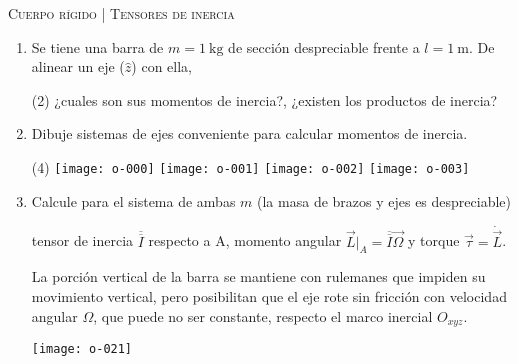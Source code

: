 \documentclass[11pt, spanish, a4paper, twoside]{article}
\begin{document}
\begin{center}
  \textsc{\large Cuerpo rígido | Tensores de inercia}
\end{center}


\begin{enumerate}



\item Se tiene una barra de \(m= \SI{1}{\kilo\gram}\) de sección despreciable frente a \(l= \SI{1}{\metre}\).
De alinear un eje (\(\hat{z}\)) con ella, 
\begin{tasks}(2)
	\task	¿cuales son sus momentos de inercia?,
	\task ¿existen los productos de inercia? 
\end{tasks}


\item
Dibuje sistemas de ejes conveniente para calcular momentos de inercia.
\vspace{-1.1cm}
\begin{tasks}(4)
	\task \texttt{[image: o-000]}
	\task \texttt{[image: o-001]}
	\task \texttt{[image: o-002]}
	\task \texttt{[image: o-003]}
\end{tasks}



\item 
\begin{minipage}[t][4.5cm]{0.7\textwidth}
Calcule para el sistema de ambas $m$ (la masa de brazos y ejes es despreciable)
\begin{tasks} 
	\task tensor de inercia \(\overline{\overline{I}}\) respecto a A,
	\task momento angular $\vec{L}\bigg\rvert_A = \overline{\overline{I}} \vec{\Omega}$ y torque $\vec{\tau} = \dot{\vec{L}}$.
\end{tasks}
La porción vertical de la barra se mantiene con rulemanes que impiden su movimiento vertical, pero posibilitan que el eje rote sin fricción con velocidad angular $\Omega$, que puede no ser constante, respecto el marco inercial $O_{xyz}$.
\end{minipage}
\begin{minipage}[c][0cm][t]{0.25\textwidth}
	\texttt{[image: o-021]}
\end{minipage}




\end{enumerate}
\end{document}
